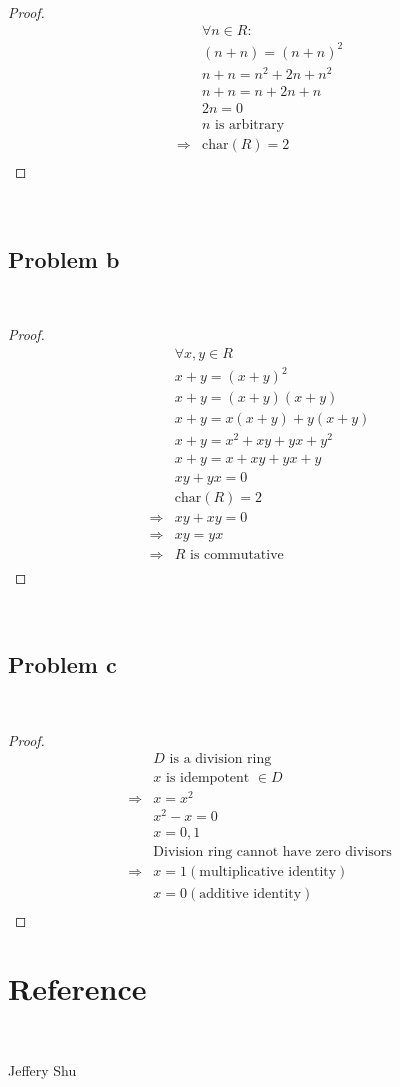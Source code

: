 \documentclass{article}
\begin{document}
~

\begin{proof}
    \begin{align*}
        &\forall n\in R:\\
        &(n+n)=(n+n)^2\\
        &n+n=n^2+2n+n^2\\
        &n+n=n+2n+n\\
        &2n=0\\
        &n\text{ is arbitrary}\\
        \Rightarrow&\text{char}(R)=2\\
    \end{align*}
\end{proof}

~

\subsection*{Problem b}

~

\begin{proof}
    \begin{align*}
        &\forall x,y\in R\\
        &x+y=(x+y)^2\\
        &x+y=(x+y)(x+y)\\
        &x+y=x(x+y)+y(x+y)\\
        &x+y=x^2+xy+yx+y^2\\
        &x+y=x+xy+yx+y\\
        &xy+yx=0\\
        &\text{char}(R)=2\\
        \Rightarrow&xy+xy=0\\
        \Rightarrow&xy=yx\\
        \Rightarrow&R\text{ is commutative}\\
    \end{align*}
\end{proof}

~

\subsection*{Problem c}

~

\begin{proof}
    \begin{align*}
        &D\text{ is a division ring}\\
        &x\text{ is idempotent }\in D\\
        \Rightarrow&x=x^2\\
        &x^2-x=0\\
        &x=0,1\\
        &\text{Division ring cannot have zero divisors}\\
        \Rightarrow&x=1(\text{multiplicative identity})\\
        &x=0(\text{additive identity})\\
    \end{align*}
\end{proof}

\newpage

\section*{Reference}

~

Jeffery Shu
\end{document}
